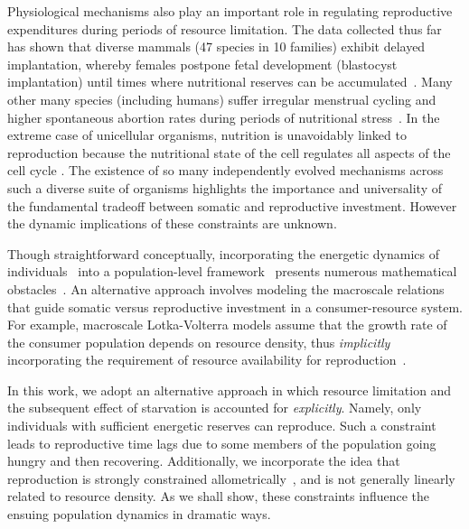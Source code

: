 \documentclass{pnastwo}
\begin{document}
\begin{article}
Physiological mechanisms also play an important role in regulating
reproductive expenditures during periods of resource limitation.  The data
collected thus far has shown that diverse mammals (47 species in 10 families)
exhibit delayed implantation, whereby females postpone fetal development
(blastocyst implantation) until times where nutritional reserves can be
accumulated~\cite{Mead:1989dt,Sandell:1990kw}.  Many other many species
(including humans) suffer irregular menstrual cycling and higher spontaneous
abortion rates during periods of nutritional
stress~\cite{Bulik:1999eo,Trites:2003cc}.  In the extreme case of unicellular
organisms, nutrition is unavoidably linked to reproduction because the
nutritional state of the cell regulates all aspects of the cell cycle
\cite{Glazier:2009hq}.  The existence of so many independently evolved
mechanisms across such a diverse suite of organisms highlights the importance
and universality of the fundamental tradeoff between somatic and reproductive
investment.  However the dynamic implications of these constraints are
unknown.

Though straightforward conceptually, incorporating the energetic dynamics of
individuals~\cite{Kooi2000} into a population-level
framework~\cite{Kooi2000,Sousa:2010ez} presents numerous mathematical
obstacles~\cite{Diekmann:2010da}.  An alternative approach involves modeling
the macroscale relations that guide somatic versus reproductive investment in
a consumer-resource system.  For example, macroscale Lotka-Volterra models
assume that the growth rate of the consumer population depends on resource
density, thus \emph{implicitly} incorporating the requirement of resource
availability for reproduction~\cite{murdoch:2003}.

In this work, we adopt an alternative approach in which resource limitation
and the subsequent effect of starvation is accounted for \emph{explicitly}.
Namely, only individuals with sufficient energetic reserves can reproduce.
Such a constraint leads to reproductive time lags due to some members of the
population going hungry and then recovering.  Additionally, we incorporate the
idea that reproduction is strongly constrained
allometrically~\cite{Kempes:2012hy}, and is not generally linearly related to
resource density.  As we shall show, these constraints influence the ensuing
population dynamics in dramatic ways.
\\


\end{article}
\end{document}
